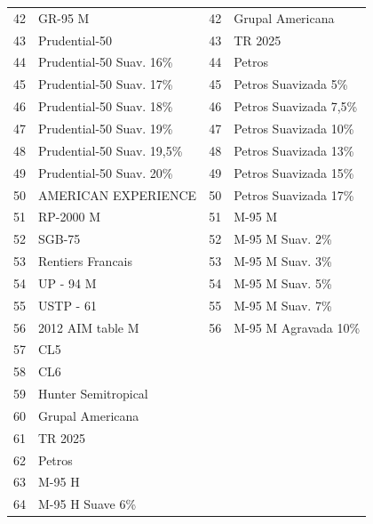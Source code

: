 \begin{singlespace}
\begin{longtable}{clcl}
42 & GR-95 M                           & 42 & Grupal Americana \\
43 & Prudential-50                     & 43 & TR 2025 \\
44 & Prudential-50 Suav. 16\%         & 44 & Petros \\
45 & Prudential-50 Suav. 17\%         & 45 & Petros Suavizada 5\% \\
46 & Prudential-50 Suav. 18\%         & 46 & Petros Suavizada 7,5\% \\
47 & Prudential-50 Suav. 19\%         & 47 & Petros Suavizada 10\% \\
48 & Prudential-50 Suav. 19,5\%       & 48 & Petros Suavizada 13\% \\
49 & Prudential-50 Suav. 20\%         & 49 & Petros Suavizada 15\% \\
50 & AMERICAN EXPERIENCE              & 50 & Petros Suavizada 17\% \\
51 & RP-2000 M                         & 51 & M-95 M \\
52 & SGB-75                            & 52 & M-95 M Suav. 2\% \\
53 & Rentiers Francais                 & 53 & M-95 M Suav. 3\% \\
54 & UP - 94 M                         & 54 & M-95 M Suav. 5\% \\
55 & USTP - 61                         & 55 & M-95 M Suav. 7\% \\
56 & 2012 AIM table M                 & 56 & M-95 M Agravada 10\% \\
57 & CL5                               & & \\
58 & CL6                               & & \\
59 & Hunter Semitropical               & & \\
60 & Grupal Americana                  & & \\
61 & TR 2025                           & & \\
62 & Petros                            & & \\
63 & M-95 H                            & & \\
64 & M-95 H Suave 6\%                 & & \\
\end{longtable}
\end{singlespace}